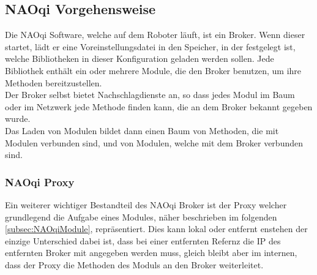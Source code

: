 \subsection{NAOqi Vorgehensweise}\label{subsec:NAOqiVorgehensweise}
Die NAOqi Software, welche auf dem Roboter läuft, ist ein Broker. Wenn dieser startet, lädt er eine Voreinstellungsdatei in den Speicher, in der festgelegt ist, welche Bibliotheken in dieser Konfiguration geladen werden sollen. Jede Bibliothek enthält ein oder mehrere Module, die den Broker benutzen, um ihre Methoden bereitzustellen.\\
Der Broker selbst bietet Nachschlagdienste an, so dass jedes Modul im Baum oder im Netzwerk jede Methode finden kann, die an dem Broker bekannt gegeben wurde.\\
Das Laden von Modulen bildet dann einen Baum von Methoden, die mit Modulen verbunden sind, und von Modulen, welche mit dem Broker verbunden sind.\\

\subsubsection{NAOqi Proxy}\label{subsubsec:NAOqiProxy}
Ein weiterer wichtiger Bestandteil des NAOqi Broker ist der Proxy welcher grundlegend die Aufgabe eines Modules, näher beschrieben im folgenden \autoref{subsec:NAOqiModule}, repräsentiert. Dies kann lokal oder entfernt enstehen der einzige Unterschied dabei ist, dass bei einer entfernten Refernz die \ac{IP} des entfernten Broker mit angegeben werden muss, gleich bleibt aber im internen, dass der Proxy die Methoden des Moduls an den Broker weiterleitet.\\

